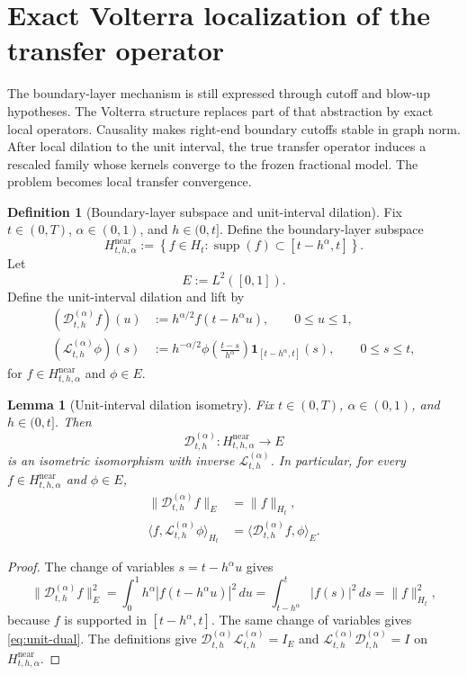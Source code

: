 \documentclass[11pt,a4paper]{amsart}
\theoremstyle{plain}
\newtheorem{lemma}[theorem]{Lemma}
\theoremstyle{definition}
\newtheorem{definition}[theorem]{Definition}
\theoremstyle{remark}
\newcommand{\one}{\mathbf 1}
\begin{document}
\section{Exact Volterra localization of the transfer operator}\label{sec:local-transfer}

The boundary-layer mechanism is still expressed through cutoff and blow-up hypotheses.  The
Volterra structure replaces part of that abstraction by exact local operators.  Causality makes
right-end boundary cutoffs stable in graph norm.  After local dilation to the unit interval, the
true transfer operator induces a rescaled family whose kernels converge to the frozen fractional
model.  The problem becomes local transfer convergence.

\begin{definition}[Boundary-layer subspace and unit-interval dilation]
\label{def:unit-dilation}
Fix $t\in(0,T)$, $\alpha\in(0,1)$, and $h\in(0,t]$. Define the boundary-layer subspace
\[
H_{t,h,\alpha}^{\mathrm{near}}
:=
\left\{
f\in H_t:\operatorname{supp}(f)\subset[t-h^\alpha,t]
\right\}.
\]
Let
\[
E:=L^2([0,1]).
\]
Define the unit-interval dilation and lift by
\begin{align}
(\mathcal D_{t,h}^{(\alpha)}f)(u)
&:=
h^{\alpha/2}f(t-h^\alpha u),
\qquad 0\le u\le 1, \label{eq:unit-dilation}\\
(\mathcal L_{t,h}^{(\alpha)}\phi)(s)
&:=
h^{-\alpha/2}\phi\!\left(\frac{t-s}{h^\alpha}\right)\one_{[t-h^\alpha,t]}(s),
\qquad 0\le s\le t, \label{eq:unit-lift}
\end{align}
for $f\in H_{t,h,\alpha}^{\mathrm{near}}$ and $\phi\in E$.
\end{definition}

\begin{lemma}[Unit-interval dilation isometry]\label{lem:unit-dilation}
Fix $t\in(0,T)$, $\alpha\in(0,1)$, and $h\in(0,t]$. Then
\[
\mathcal D_{t,h}^{(\alpha)}:H_{t,h,\alpha}^{\mathrm{near}}\to E
\]
is an isometric isomorphism with inverse $\mathcal L_{t,h}^{(\alpha)}$. In particular, for
every $f\in H_{t,h,\alpha}^{\mathrm{near}}$ and $\phi\in E$,
\begin{align}
\|\mathcal D_{t,h}^{(\alpha)}f\|_E &= \|f\|_{H_t}, \label{eq:unit-iso}\\
\langle f,\mathcal L_{t,h}^{(\alpha)}\phi\rangle_{H_t}
&=
\langle \mathcal D_{t,h}^{(\alpha)}f,\phi\rangle_E. \label{eq:unit-dual}
\end{align}
\end{lemma}

\begin{proof}
The change of variables $s=t-h^\alpha u$ gives
\[
\|\mathcal D_{t,h}^{(\alpha)}f\|_E^2
=
\int_0^1 h^\alpha |f(t-h^\alpha u)|^2\,du
=
\int_{t-h^\alpha}^t |f(s)|^2\,ds
=
\|f\|_{H_t}^2,
\]
because $f$ is supported in $[t-h^\alpha,t]$. The same change of variables gives
\eqref{eq:unit-dual}. The definitions give
$\mathcal D_{t,h}^{(\alpha)}\mathcal L_{t,h}^{(\alpha)}=I_E$ and
$\mathcal L_{t,h}^{(\alpha)}\mathcal D_{t,h}^{(\alpha)}=I$ on
$H_{t,h,\alpha}^{\mathrm{near}}$.
\end{proof}
\end{document}
